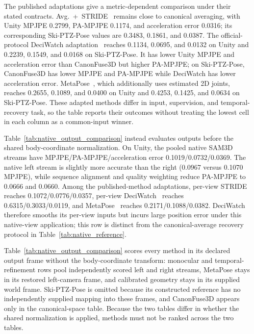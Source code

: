 \documentclass[preprint,12pt]{elsarticle}
\begin{document}
The published adaptations give a metric-dependent comparison under their stated contracts. Avg.~+~STRIDE~\cite{lal2025stride} remains close to canonical averaging, with Unity MPJPE 0.2799, PA-MPJPE 0.1174, and acceleration error 0.0316; its corresponding Ski-PTZ-Pose values are 0.3483, 0.1861, and 0.0387. The official-protocol DeciWatch adaptation~\cite{zeng2022deciwatch} reaches 0.1134, 0.0695, and 0.0132 on Unity and 0.2239, 0.1549, and 0.0168 on Ski-PTZ-Pose. It has lower Unity MPJPE and acceleration error than CanonFuse3D but higher PA-MPJPE; on Ski-PTZ-Pose, CanonFuse3D has lower MPJPE and PA-MPJPE while DeciWatch has lower acceleration error. MetaPose~\cite{usman2022metapose}, which additionally uses estimated 2D joints, reaches 0.2655, 0.1089, and 0.0400 on Unity and 0.4253, 0.1425, and 0.0634 on Ski-PTZ-Pose. These adapted methods differ in input, supervision, and temporal-recovery task, so the table reports their outcomes without treating the lowest cell in each column as a common-input winner.




Table~\ref{tab:native_output_comparison} instead evaluates outputs before the shared body-coordinate normalization. On Unity, the pooled native SAM3D streams have MPJPE/PA-MPJPE/acceleration error 0.1019/0.0732/0.0369. The native left stream is slightly more accurate than the right (0.0967 versus 0.1070 MPJPE), while sequence alignment and quality weighting reduce PA-MPJPE to 0.0666 and 0.0660. Among the published-method adaptations, per-view STRIDE~\cite{lal2025stride} reaches 0.1072/0.0776/0.0357, per-view DeciWatch~\cite{zeng2022deciwatch} reaches 0.6315/0.3033/0.0119, and MetaPose~\cite{usman2022metapose} reaches 0.2171/0.1088/0.0382. DeciWatch therefore smooths its per-view inputs but incurs large position error under this native-view application; this row is distinct from the canonical-average recovery protocol in Table~\ref{tab:native_reference}.

Table~\ref{tab:native_output_comparison} scores every method in its declared output frame without the body-coordinate transform: monocular and temporal-refinement rows pool independently scored left and right streams, MetaPose stays in its restored left-camera frame, and calibrated geometry stays in its supplied world frame. Ski-PTZ-Pose is omitted because its constructed reference has no independently supplied mapping into these frames, and CanonFuse3D appears only in the canonical-space table. Because the two tables differ in whether the shared normalization is applied, methods must not be ranked across the two tables.
\end{document}
